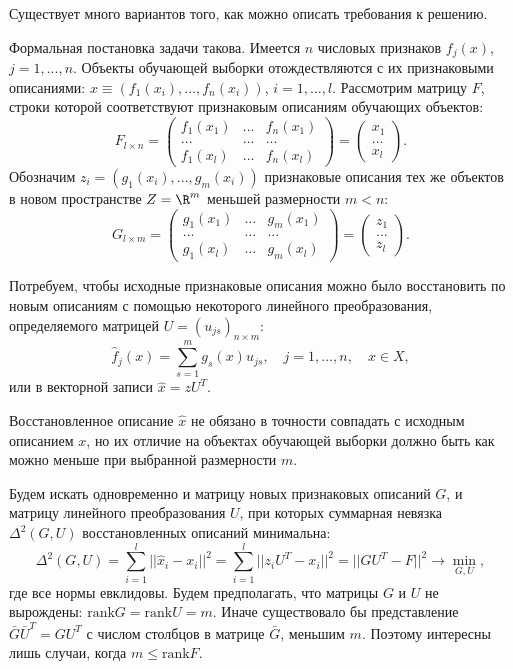 \begin{remark}
    Существует много вариантов того, как можно описать требования к решению.
\end{remark}

Формальная постановка задачи такова. Имеется $n$ числовых признаков $f_j(x)$, $j=1,...,n$. Объекты обучающей выборки отождествляются с их признаковыми описаниями: $x\equiv(f_1(x_i),...,f_n(x_i))$, $i=1,...,l$. Рассмотрим матрицу $F$, строки которой соответствуют признаковым описаниям обучающих объектов:
\[
    F_{l\times n}=
    \begin{pmatrix}
        f_1(x_1) & ... & f_n(x_1) \\
          ...    & ... &   ...    \\
        f_1(x_l) & ... & f_n(x_l)
    \end{pmatrix}=
    \begin{pmatrix}
        x_1 \\
        ... \\
        x_l
    \end{pmatrix}.
\]
Обозначим $z_i=(g_1(x_i),...,g_m(x_i))$ признаковые описания тех же объектов в новом пространстве $Z=\R^m$ меньшей размерности $m<n$:
\[
    G_{l\times m}=
    \begin{pmatrix}
        g_1(x_1) & ... & g_m(x_1) \\
          ...    & ... &   ...    \\
        g_1(x_l) & ... & g_m(x_l)
    \end{pmatrix}=
    \begin{pmatrix}
        z_1 \\
        ... \\
        z_l
    \end{pmatrix}.
\]

Потребуем, чтобы исходные признаковые описания можно было восстановить по новым описаниям с помощью некоторого линейного преобразования, определяемого матрицей $U=(u_{js})_{n\times m}$:
\[
    \widehat{f}_j(x)=\sum_{s=1}^mg_s(x)u_{js},\quad j=1,...,n,\quad x\in X,
\]
или в векторной записи $\widehat{x}=zU^T$.
\begin{remark}
    Восстановленное описание $\widehat{x}$ не обязано в точности совпадать с исходным описанием $x$, но их отличие на объектах обучающей выборки должно быть как можно меньше при выбранной размерности $m$.
\end{remark}

Будем искать одновременно и матрицу новых признаковых описаний $G$, и матрицу линейного преобразования $U$, при которых суммарная невязка $\Delta^2(G,U)$ восстановленных описаний минимальна:
\[
    \Delta^2(G,U)=\sum_{i=1}^l||\widehat{x}_i-x_i||^2=\sum_{i=1}^l||z_iU^T-x_i||^2=||GU^T-F||^2\to\min_{G,U},
\]
где все нормы евклидовы.
Будем предполагать, что матрицы $G$ и $U$ не вырождены: $\mathrm{rank}G=\mathrm{rank}U=m$. Иначе существовало бы представление $\bar{G}\bar{U}^T=GU^T$ с числом столбцов в матрице $\bar{G}$, меньшим $m$. Поэтому интересны лишь случаи, когда $m\leq\mathrm{rank}F$.

